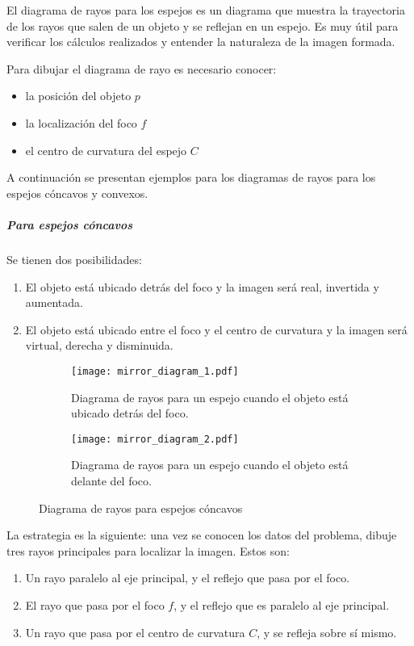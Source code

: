 El diagrama de rayos para los espejos es un diagrama que muestra la trayectoria de los rayos que salen de un objeto y se reflejan en un espejo. Es muy útil para verificar los cálculos realizados y entender la naturaleza de la imagen formada.

\noindent Para dibujar el diagrama de rayo es necesario conocer:
\begin{itemize}
  \item la posición del objeto \(p\)
  \item la localización del foco \(f\)
  \item el centro de curvatura del espejo \(C\)
\end{itemize}

\noindent A continuación se presentan ejemplos para los diagramas de rayos para los espejos cóncavos y convexos.

\subparagraph{Para espejos cóncavos}

Se tienen dos posibilidades:
\begin{enumerate}
  \item El objeto está ubicado detrás del foco y la imagen será real, invertida y aumentada.
  \item El objeto está ubicado entre el foco y el centro de curvatura y la imagen será virtual, derecha y disminuida.
\end{enumerate}

\begin{figure}[ht]
  \centering
  \begin{subfigure}[b]{0.51\textwidth}
      \centering
      \texttt{[image: mirror\_diagram\_1.pdf]}
      \caption{Diagrama de rayos para un espejo cuando el objeto está ubicado detrás del foco.}
      \label{fig:mirror_diagram_1}
  \end{subfigure}
  \hfill
  \begin{subfigure}[b]{0.45\textwidth}
      \centering
      \texttt{[image: mirror\_diagram\_2.pdf]}
      \caption{Diagrama de rayos para un espejo cuando el objeto está delante del foco.}
      \label{fig:mirror_diagram_2}
  \end{subfigure}
  \caption{Diagrama de rayos para espejos cóncavos}
  \label{fig:mirror_diagram}
\end{figure}

\noindent La estrategia es la siguiente: una vez se conocen los datos del problema, dibuje tres rayos principales para localizar la imagen. Estos son:

\begin{enumerate}
  \item Un rayo paralelo al eje principal, y el reflejo que pasa por el foco.
  \item El rayo que pasa por el foco \(f\), y el reflejo que es paralelo al eje principal.
  \item Un rayo que pasa por el centro de curvatura \(C\), y se refleja sobre sí mismo.
\end{enumerate}

